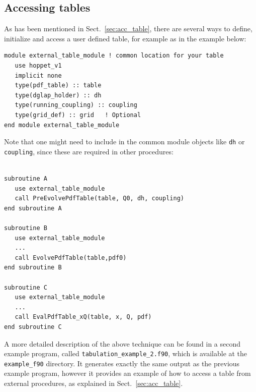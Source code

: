 \documentclass[12pt]{article}
\newcommand{\ttt}[1]{\texttt{#1}}
\begin{document}
\subsection{Accessing tables}

As has been mentioned in Sect.~\ref{sec:acc_table}, 
there are several ways to define, initialize
and access a user defined table, for example 
as in the example below:
\begin{lstlisting}
module external_table_module ! common location for your table
   use hoppet_v1
   implicit none
   type(pdf_table) :: table
   type(dglap_holder) :: dh
   type(running_coupling) :: coupling
   type(grid_def) :: grid   ! Optional
end module external_table_module
\end{lstlisting}
Note that one might need to include in the common module objects
like \texttt{dh} or \ttt{coupling}, since these are
required in other procedures:
\begin{lstlisting}

subroutine A
   use external_table_module
   call PreEvolvePdfTable(table, Q0, dh, coupling)
end subroutine A

subroutine B
   use external_table_module
   ...
   call EvolvePdfTable(table,pdf0)
end subroutine B

subroutine C
   use external_table_module
   ...
   call EvalPdfTable_xQ(table, x, Q, pdf)
end subroutine C

\end{lstlisting}

A more detailed description of the above technique 
can be found in a 
second example program, called \ttt{tabulation\_example\_2.f90},
which is available at the \ttt{example\_f90} 
directory. It generates exactly
the same output as the previous example program, however it
provides an example of how to access a table from
external procedures, as explained in Sect.~\ref{sec:acc_table}.




\end{document}
